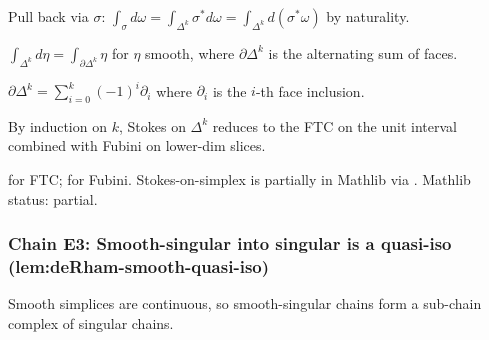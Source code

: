\begin{lemma}
\label{lem:dss-r1}
Pull back via $\sigma$: $\int_{\sigma}d\omega = \int_{\Delta^{k}}\sigma^{*}d\omega = \int_{\Delta^{k}}d(\sigma^{*}\omega)$ by naturality.
\leanok
\end{lemma}

\begin{lemma}
\label{lem:dss-r2}
$\int_{\Delta^{k}} d\eta = \int_{\partial\Delta^{k}}\eta$ for $\eta$ smooth, where $\partial\Delta^{k}$ is the alternating sum of faces.
\leanok
\end{lemma}

\begin{lemma}
\label{lem:dss-r3}
$\partial\Delta^{k} = \sum_{i=0}^{k}(-1)^{i}\partial_{i}$ where $\partial_{i}$ is the $i$-th face inclusion.
\leanok
\end{lemma}

\begin{lemma}
\label{lem:dss-r4}
By induction on $k$, Stokes on $\Delta^{k}$ reduces to the FTC on the unit interval combined with Fubini on lower-dim slices.
\leanok
\end{lemma}

\begin{lemma}
\label{lem:dss-r5}
 for FTC;  for Fubini.  Stokes-on-simplex is partially in Mathlib via .  Mathlib status: partial.
\leanok
\end{lemma}

\subsubsection*{Chain E3: Smooth-singular into singular is a quasi-iso (lem:deRham-smooth-quasi-iso)}

\begin{lemma}
\label{lem:dsq-r1}
Smooth simplices are continuous, so smooth-singular chains form a sub-chain complex of singular chains.
\leanok
\end{lemma}


